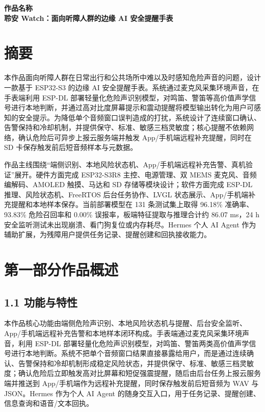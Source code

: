 \documentclass[UTF8,a4paper,12pt]{ctexart}
\begin{document}
\begin{center}
  {\bfseries 作品名称}\\[0.5em]
  {\bfseries 聆安 Watch：面向听障人群的边缘 AI 安全提醒手表}
\end{center}

\section*{摘要}

本作品面向听障人群在日常出行和公共场所中难以及时感知危险声音的问题，设计一款基于 ESP32-S3 的边缘 AI 安全提醒手表。系统通过麦克风采集环境声音，在手表端利用 ESP-DL 部署轻量化危险声识别模型，对鸣笛、警笛等高价值声学信号进行本地判断，并通过高对比度屏幕提示和震动提醒将模型输出转化为用户可感知的安全提示。为降低单个音频窗口误判造成的打扰，系统设计了连续窗口确认、告警保持和冷却机制，并提供保守、标准、敏感三档灵敏度；核心提醒不依赖网络，确认危险后可异步上报云服务端并触发 App/手机端远程补充提醒，同时在 SD 卡保存触发前后短音频样本与元数据。

作品主线围绕“端侧识别、本地风险状态机、App/手机端远程补充告警、真机验证”展开。硬件方面完成 ESP32-S3R8 主控、电源管理、双 MEMS 麦克风、音频编解码、AMOLED 触摸、马达和 SD 存储等模块设计；软件方面完成 ESP-DL 推理、风险状态机、FreeRTOS 后台任务协作、LVGL 状态展示、App/手机端补充提醒和本地样本保存。当前部署模型在 131 条测试集上取得 96.18\% 准确率、93.83\% 危险召回率和 0.00\% 误报率，板端特征提取与推理合计约 86.07 ms，24 h 安全监听测试未出现崩溃、看门狗复位或内存耗尽。Hermes 个人 AI Agent 作为辅助扩展，为残障用户提供任务记录、提醒创建和回执接收能力。

\section*{第一部分\quad 作品概述}

\subsection*{1.1 功能与特性}

本作品核心功能由端侧危险声识别、本地风险状态机与提醒、后台安全监听、App/手机端远程补充告警和本地样本闭环构成。手表端通过麦克风采集环境声音，利用 ESP-DL 部署轻量化危险声识别模型，对鸣笛、警笛两类高价值声学信号进行本地判断。系统不把单个音频窗口结果直接暴露给用户，而是通过连续确认、告警保持和冷却机制形成稳定风险状态，并提供保守、标准、敏感三档灵敏度；确认危险后立即触发高对比屏幕和短促强震提醒，随后由后台任务上报云服务端并推送到 App/手机端作为远程补充提醒，同时保存触发前后短音频为 WAV 与 JSON。Hermes 作为个人 AI Agent 的随身交互入口，用于任务记录、提醒创建、信息查询和语音/文本回执。
\end{document}
